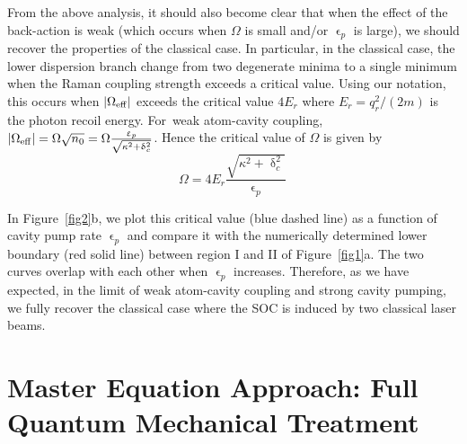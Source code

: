 \documentclass[atoms,article,accept,moreauthors,pdftex,12pt,a4paper]{mdpi}
\begin{document}
From the above analysis, it should also become clear that when the effect of the back-action is weak (which occurs when $\Omega$ is small and/or $\upvarepsilon_p$ is large), we should recover the properties of the classical case. In particular, in the classical case, the lower dispersion branch change from two degenerate minima to a single minimum when the Raman coupling strength exceeds a critical value. Using our notation, this occurs when $|\Omega_{\rm eff}|$ exceeds the critical value $4E_r$ where $E_r=q_r^2/(2m)$ is the photon recoil energy. For~weak atom-cavity coupling, $|\Omega_{\rm eff}| = \Omega \sqrt{n_0}={\Omega} \frac{\upvarepsilon_p}{\sqrt{\kappa^2+ \updelta_c^2}}$. Hence the critical value of $\Omega$ is given by
\begin{equation}
\Omega=4E_r\frac{\sqrt{\kappa^2+\updelta_c^2}}{\upvarepsilon_p}\,
\label{ome}
\end{equation}

In Figure~\ref{fig2}b, we plot this critical value (blue dashed line) as a function of cavity pump rate $\upvarepsilon_p$ and compare it with the numerically determined lower boundary (red solid line) between region I and II of Figure~\ref{fig1}a. The two curves overlap with each other when $\upvarepsilon_p$ increases. Therefore, as we have expected, in the limit of weak atom-cavity coupling and strong cavity pumping, we fully recover the classical case where the SOC is induced by two classical laser beams.



\section{Master Equation Approach: Full Quantum Mechanical Treatment } \label{master}
\end{document}
